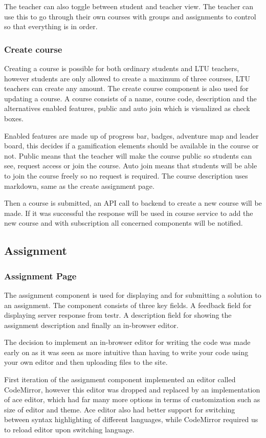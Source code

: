 The teacher can also toggle between student and teacher view. The teacher can use this to go through their own courses with groups and assignments to control so that everything is in order. 

\subsubsection{Create course}
Creating a course is possible for both ordinary students  and LTU teachers, however students are only allowed to create a maximum of three courses, LTU teachers can create any amount. The create course component is also used for updating a course. A course consists of a name, course code, description and the alternatives enabled features, public and auto join which is visualized as check boxes.

Enabled features are made up of progress bar, badges, adventure map and leader board, this decides if a gamification elements should be available in the course or not. Public means that the teacher will make the course public so students can see, request access or join the course. Auto join means that students will be able to join the course freely so no request is required. The course description uses markdown, same as the create assignment page. 

Then a course is submitted, an API call to backend to create a new course will be made. If it was successful the response will be used in course service to add the new course and with subscription all concerned components will be notified. 

\subsection{Assignment}
\subsubsection{Assignment Page}
The assignment component is used for displaying and for submitting a solution to an assignment. The component consists of three key fields. A feedback field for displaying server response from testr. A description field for showing the assignment description and finally an in-browser editor. 

The decision to implement an in-browser editor for writing the code was made early on as it was seen as more intuitive than having to write your code using your own editor and then uploading files to the site.

First iteration of the assignment component implemented an editor called CodeMirror, however this editor was dropped and replaced by an implementation of ace editor, which had far many more options in terms of customization such as size of editor and theme. Ace editor also had better support for switching between syntax highlighting of different languages, while CodeMirror required us to reload editor upon switching language. 

